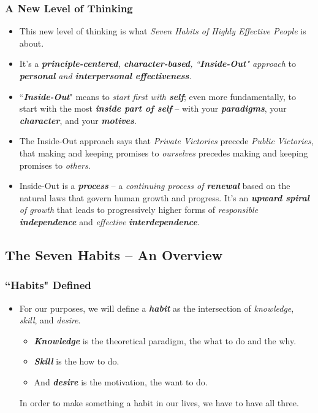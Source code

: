 \documentclass[11pt]{article}
\begin{document}
\subsubsection{A New Level of Thinking}
\begin{itemize}
\item This new level of thinking is what \emph{Seven Habits of Highly Effective People} is about.

\item It's a \emph{\textbf{principle-centered}, \textbf{character-based}, ``\textbf{Inside-Out}" approach} to \emph{\textbf{personal} and \textbf{interpersonal effectiveness}}.

\item ``\emph{\textbf{Inside-Out}}" means to \emph{start first with \textbf{self}}; even more fundamentally, to start with the most \emph{\textbf{inside part of self}} -- with your \emph{\textbf{paradigms}}, your \emph{\textbf{character}}, and your \emph{\textbf{motives}}.

\item The Inside-Out approach says that \emph{Private Victories} precede \emph{Public Victories}, that making
and keeping promises to \emph{ourselves} precedes making and keeping promises to \emph{others}.

\item Inside-Out is a \emph{\textbf{process}} -- a \emph{continuing process of \textbf{renewal}} based on the natural laws that govern human growth and progress. It's an \emph{\textbf{upward spiral} of growth} that leads to progressively higher forms of \emph{responsible} \textbf{\emph{independence}} and \emph{effective} \emph{\textbf{interdependence}}.
\end{itemize}
\subsection{The Seven Habits -- An Overview}
\subsubsection{``Habits" Defined}
\begin{itemize}
\item For our purposes, we will define a \emph{\textbf{habit}} as the intersection of \emph{knowledge}, \emph{skill}, and \emph{desire}.
\begin{itemize}
\item \emph{\textbf{Knowledge}} is the theoretical paradigm, the what to do and the why. 
\item \emph{\textbf{Skill}} is the how to do. 
\item And \emph{\textbf{desire}} is the motivation, the want to do.
\end{itemize}
 In order to make something a habit in our lives, we have to have all three.
\end{itemize}
\end{document}

